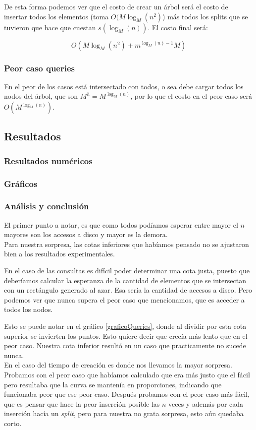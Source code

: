 \documentclass[letterpaper,11pt]{article} %
\begin{document}
			De esta forma podemos ver que el costo de crear un árbol será el costo de insertar todos los elementos (toma $O(M\log_{M}(n^{2})$) más todos los splits que se tuvieron que hace que cuestan $s(\log_{M}(n))$. El costo final será:
			
			$$ O(M \log_{M}(n^{2}) + m^{\log_{M}(n)-1}M) $$
			
		\subsubsection{Peor caso queries}
			En el peor de los casos está intersectado con todos, o sea debe cargar todos los nodos del árbol, que son $M^{h} = M^{\log_{M}(n)}$, por lo que el costo en el peor caso será $O(M^{\log_{M}(n)})$.
			
	\subsection{Resultados}
	
		\subsubsection{Resultados numéricos}
			
		\subsubsection{Gráficos}
		
		\subsubsection{Análisis y conclusión}
		
			El primer punto a notar, es que como todos podíamos esperar entre mayor el $n$ mayores son los accesos a disco y mayor es la demora.
			\\
			Para nuestra sorpresa, las cotas inferiores que habíamos pensado no se ajustaron bien a los resultados experimentales.
			
			En el caso de las consultas es difícil poder determinar una cota justa, puesto que deberíamos calcular la esperanza de la cantidad de elementos que se intersectan con un rectángulo generado al azar. Esa sería la cantidad de accesos a disco. Pero podemos ver que nunca supera el peor caso que mencionamos, que es acceder a todos los nodos.
			
			Esto se puede notar en el gráfico \ref{graficoQueries}, donde al dividir por esta cota superior se invierten los puntos. Esto quiere decir que crecía más lento que en el peor caso. Nuestra cota inferior resultó en un caso que practicamente no sucede nunca.
			\\
			En el caso del tiempo de creación es donde nos llevamos la mayor sorpresa. Probamos con el peor caso que habíamos calculado que era más justo que el fácil pero resultaba que la curva se mantenía en proporciones, indicando que funcionaba peor que ese peor caso. Después probamos con el peor caso más fácil, que es pensar que hace la peor inserción posible las $n$ veces y además por cada inserción hacía un \textit{split}, pero para nuestra no grata sorpresa, esto aún quedaba corto.
			
\end{document}
